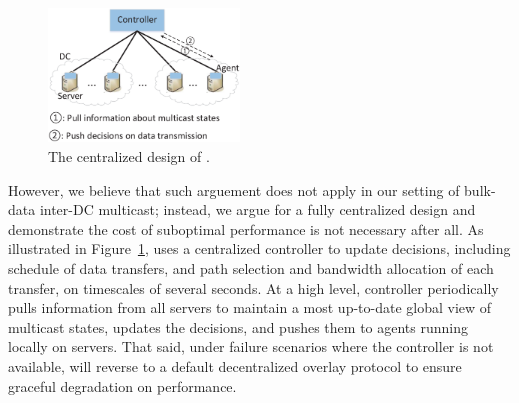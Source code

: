 \begin{figure}[t]
  \centering
  \includegraphics[width=2in]{images/framework.eps}
  \caption{The centralized design of \name.}
  \label{fig:framework}
\vspace{-0.4cm}
\end{figure}

However, we believe that such arguement does not apply in our
setting of bulk-data inter-DC multicast; instead, we argue for
a fully centralized design and demonstrate the cost of
suboptimal performance is not necessary after all.
As illustrated in Figure~\ref{fig:framework}, \name uses a centralized controller to update decisions,
including schedule of data transfers, and path selection and
bandwidth allocation of each transfer, on timescales of
several seconds.
At a high level, \name controller periodically pulls information
from all servers to maintain a most up-to-date global view of
multicast states, updates the decisions, and pushes them
to agents running locally on servers.
That said, under failure scenarios where the controller is
not available, \name will reverse to a default decentralized
overlay protocol to ensure graceful degradation on performance.

